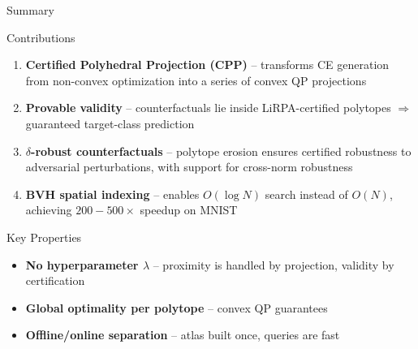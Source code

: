 \documentclass[aspectratio=169, 10pt]{beamer}
\begin{document}
\begin{frame}{Summary}

\begin{block}{Contributions}
\begin{enumerate}
  \item \textbf{Certified Polyhedral Projection (CPP)} -- transforms CE generation from non-convex optimization into a series of convex QP projections
  \item \textbf{Provable validity} -- counterfactuals lie inside LiRPA-certified polytopes $\Rightarrow$ guaranteed target-class prediction
  \item \textbf{$\delta$-robust counterfactuals} -- polytope erosion ensures certified robustness to adversarial perturbations, with support for cross-norm robustness
  \item \textbf{BVH spatial indexing} -- enables $O(\log N)$ search instead of $O(N)$, achieving $200{-}500\times$ speedup on MNIST
\end{enumerate}
\end{block}

\bigskip

\begin{block}{Key Properties}
\begin{itemize}
  \item \textbf{No hyperparameter $\lambda$} -- proximity is handled by projection, validity by certification
  \item \textbf{Global optimality per polytope} -- convex QP guarantees
  \item \textbf{Offline/online separation} -- atlas built once, queries are fast
\end{itemize}
\end{block}

\end{frame}



\end{document}
